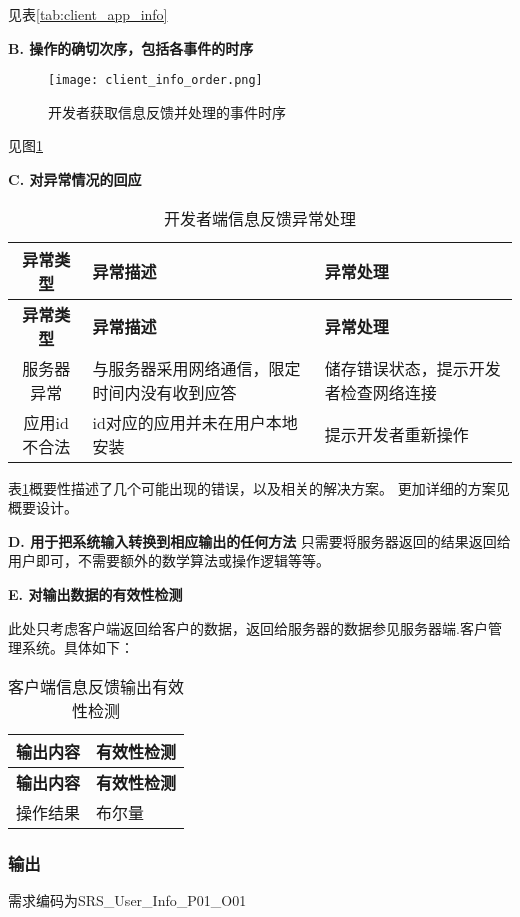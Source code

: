 见表\ref{tab:client_app_info}

\textbf{B. 操作的确切次序，包括各事件的时序}

\begin{figure}[ht]
	\centering
	\texttt{[image: client\_info\_order.png]}
	\caption{开发者获取信息反馈并处理的事件时序} \label{fig:client_info_order}
\end{figure}
见图\ref{fig:client_info_order}

\textbf{C. 对异常情况的回应}

\begin{longtable}{|c|p{6cm}|p{6cm}|}
\caption{开发者端信息反馈异常处理}\label{tab:client_info_exception}\\
\hline
\textbf{异常类型} & \textbf{异常描述} & \textbf{异常处理}\\
\hline
\endfirsthead

\hline
\textbf{异常类型} & \textbf{异常描述} & \textbf{异常处理}\\
\hline
\endhead
\hline 
\endfoot
\hline
\endlastfoot
服务器异常 & 
与服务器采用网络通信，限定时间内没有收到应答 &
储存错误状态，提示开发者检查网络连接\\
应用id不合法 
& id对应的应用并未在用户本地安装
& 提示开发者重新操作
\end{longtable}

表\ref{tab:client_info_exception}概要性描述了几个可能出现的错误，以及相关的解决方案。
更加详细的方案见概要设计。

\textbf{D. 用于把系统输入转换到相应输出的任何方法}
只需要将服务器返回的结果返回给用户即可，不需要额外的数学算法或操作逻辑等等。
		
\textbf{E. 对输出数据的有效性检测}

此处只考虑客户端返回给客户的数据，返回给服务器的数据参见服务器端.客户管理系统。具体如下：
\begin{longtable}{|p{7cm}|p{7cm}|}
\caption{客户端信息反馈输出有效性检测}\label{tab:concrete_dev_sys_output_valid} \\
\hline
\textbf{输出内容} & \textbf{有效性检测} \\
\hline
\endfirsthead
\hline
\textbf{输出内容} & \textbf{有效性检测} \\
\hline
\endhead
\hline 
\endfoot
\hline
\endlastfoot
操作结果 & 布尔量

\end{longtable}


\subsubsection{输出}
需求编码为SRS\_User\_Info\_P01\_O01


